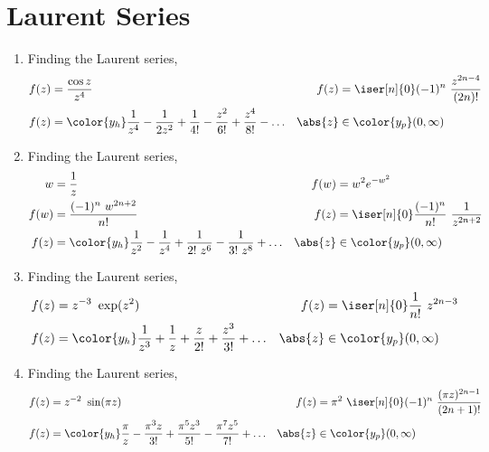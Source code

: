 \section{Laurent Series}

\begin{enumerate}
    \item Finding the Laurent series,
          \begin{align}
              f(z)    & = \frac{\cos z}{z^4}                                       &
              f(z)    & = \iser[n]{0} (-1)^n\ \frac{z^{2n - 4}}{(2n)!}               \\
              f(z)    & = \color{y_h}\frac{1}{z^4} - \frac{1}{2z^2} + \frac{1}{4!}
              - \frac{z^2}{6!} + \frac{z^4}{8!}
              - \dots &
              \abs{z} & \in \color{y_p} (0, \infty)
          \end{align}

    \item Finding the Laurent series,
          \begin{align}
              w       & = \frac{1}{z}                                         &
              f(w)    & = w^2 e^{-w^2}                                          \\
              f(w)    & = \frac{(-1)^n\ w^{2n + 2}}{n!}                       &
              f(z)    & = \iser[n]{0} \frac{(-1)^n}{n!}\ \frac{1}{z^{2n + 2}}   \\
              f(z)    & = \color{y_h}\frac{1}{z^2} - \frac{1}{z^4}
              + \frac{1}{2!\ z^6} - \frac{1}{3!\ z^8}
              + \dots &
              \abs{z} & \in \color{y_p} (0, \infty)
          \end{align}

    \item Finding the Laurent series,
          \begin{align}
              f(z)    & = z^{-3}\ \exp(z^2)                      &
              f(z)    & = \iser[n]{0} \frac{1}{n!}\ z^{2n - 3}     \\
              f(z)    & = \color{y_h}\frac{1}{z^3} + \frac{1}{z}
              + \frac{z}{2!} + \frac{z^3}{3!}
              + \dots &
              \abs{z} & \in \color{y_p} (0, \infty)
          \end{align}

    \item Finding the Laurent series,
          \begin{align}
              f(z)    & = z^{-2}\ \sin(\pi z)                                       &
              f(z)    & = \pi^2\ \iser[n]{0} (-1)^n\ \frac{(\pi z)^{2n-1}}{(2n+1)!}   \\
              f(z)    & = \color{y_h}\frac{\pi}{z} - \frac{\pi^3 z}{3!}
              + \frac{\pi^5 z^3}{5!} - \frac{\pi^7 z^5}{7!}
              + \dots &
              \abs{z} & \in \color{y_p} (0, \infty)
          \end{align}


\end{enumerate}
